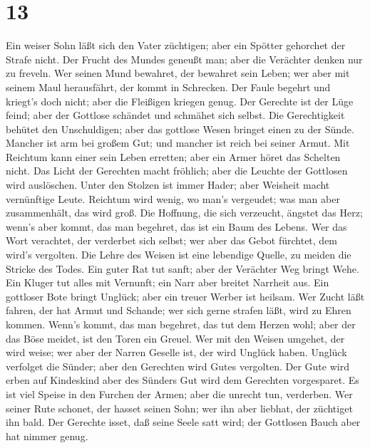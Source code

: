 \hypertarget{section-12}{%
\section{13}\label{section-12}}

 Ein weiser Sohn läßt sich den Vater züchtigen; aber ein
Spötter gehorchet der Strafe nicht.  Der Frucht des Mundes
geneußt man; aber die Verächter denken nur zu freveln.  Wer
seinen Mund bewahret, der bewahret sein Leben; wer aber mit seinem Maul
herausfährt, der kommt in Schrecken.  Der Faule begehrt und
kriegt's doch nicht; aber die Fleißigen kriegen genug.  Der
Gerechte ist der Lüge feind; aber der Gottlose schändet und schmähet
sich selbst.  Die Gerechtigkeit behütet den Unschuldigen;
aber das gottlose Wesen bringet einen zu der Sünde.  Mancher
ist arm bei großem Gut; und mancher ist reich bei seiner Armut.
 Mit Reichtum kann einer sein Leben erretten; aber ein Armer
höret das Schelten nicht.  Das Licht der Gerechten macht
fröhlich; aber die Leuchte der Gottlosen wird auslöschen. 
Unter den Stolzen ist immer Hader; aber Weisheit macht vernünftige
Leute.  Reichtum wird wenig, wo man's vergeudet; was man
aber zusammenhält, das wird groß.  Die Hoffnung, die sich
verzeucht, ängstet das Herz; wenn's aber kommt, das man begehret, das
ist ein Baum des Lebens.  Wer das Wort verachtet, der
verderbet sich selbst; wer aber das Gebot fürchtet, dem wird's
vergolten.  Die Lehre des Weisen ist eine lebendige Quelle,
zu meiden die Stricke des Todes.  Ein guter Rat tut sanft;
aber der Verächter Weg bringt Wehe.  Ein Kluger tut alles
mit Vernunft; ein Narr aber breitet Narrheit aus.  Ein
gottloser Bote bringt Unglück; aber ein treuer Werber ist heilsam.
 Wer Zucht läßt fahren, der hat Armut und Schande; wer sich
gerne strafen läßt, wird zu Ehren kommen.  Wenn's kommt,
das man begehret, das tut dem Herzen wohl; aber der das Böse meidet, ist
den Toren ein Greuel.  Wer mit den Weisen umgehet, der wird
weise; wer aber der Narren Geselle ist, der wird Unglück haben.
 Unglück verfolget die Sünder; aber den Gerechten wird
Gutes vergolten.  Der Gute wird erben auf Kindeskind aber
des Sünders Gut wird dem Gerechten vorgesparet.  Es ist
viel Speise in den Furchen der Armen; aber die unrecht tun, verderben.
 Wer seiner Rute schonet, der hasset seinen Sohn; wer ihn
aber liebhat, der züchtiget ihn bald.  Der Gerechte isset,
daß seine Seele satt wird; der Gottlosen Bauch aber hat nimmer genug.

